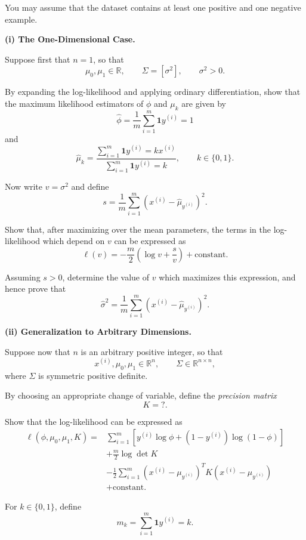 \documentclass[10pt]{article}
\newcommand{\ind}{\mathbf{1}}
\begin{document}
\begin{enumerate}
\begin{enumerate}[label=(\alph*)]
You may assume that the dataset contains at least
one positive and one negative example.

\medskip
\noindent\textbf{(i) The One-Dimensional Case.}

Suppose first that $n=1$, so that
\[
\mu_0,\mu_1\in\mathbb{R},
\qquad
\Sigma=[\sigma^2],
\qquad
\sigma^2>0.
\]

By expanding the log-likelihood and applying ordinary
differentiation, show that the maximum likelihood
estimators of $\phi$ and $\mu_k$ are given by
\[
\boxed{
\hat{\phi}
=
\frac{1}{m}
\sum_{i=1}^{m}
\ind{y^{(i)}=1}
}
\]
and
\[
\boxed{
\hat{\mu}_k
=
\frac{
\sum_{i=1}^{m}
\ind{y^{(i)}=k}x^{(i)}
}{
\sum_{i=1}^{m}
\ind{y^{(i)}=k}
},
\qquad k\in\{0,1\}.
}
\]

Now write $v=\sigma^2$ and define
\[
s
=
\frac{1}{m}
\sum_{i=1}^{m}
\left(
x^{(i)}-\hat{\mu}_{y^{(i)}}
\right)^2.
\]

Show that, after maximizing over the mean parameters,
the terms in the log-likelihood which depend on $v$
can be expressed as
\[
\ell(v)
=
-\frac{m}{2}
\left(
\log v+\frac{s}{v}
\right)
+\text{constant}.
\]

Assuming $s>0$, determine the value of $v$
which maximizes this expression, and hence prove that
\[
\boxed{
\hat{\sigma}^2
=
\frac{1}{m}
\sum_{i=1}^{m}
\left(
x^{(i)}-\hat{\mu}_{y^{(i)}}
\right)^2.
}
\]

\medskip
\noindent\textbf{(ii) Generalization to Arbitrary Dimensions.}

Suppose now that $n$ is an arbitrary positive integer,
so that
\[
x^{(i)},\mu_0,\mu_1\in\mathbb{R}^{n},
\qquad
\Sigma\in\mathbb{R}^{n\times n},
\]
where $\Sigma$ is symmetric positive definite.

By choosing an appropriate change of variable, define the \emph{precision matrix}
\[
\boxed{
K = ? .
}
\]

Show that the log-likelihood can be expressed as
\[
\begin{aligned}
\ell(\phi,\mu_0,\mu_1,K)
={}&
\sum_{i=1}^{m}
\left[
y^{(i)}\log\phi
+
(1-y^{(i)})\log(1-\phi)
\right]
\\[4pt]
&+
\frac{m}{2}\log\det K
\\[4pt]
&-
\frac{1}{2}
\sum_{i=1}^{m}
(x^{(i)}-\mu_{y^{(i)}})^T
K
(x^{(i)}-\mu_{y^{(i)}})
\\[4pt]
&+\text{constant}.
\end{aligned}
\]

For $k\in\{0,1\}$, define
\[
m_k
=
\sum_{i=1}^{m}
\ind{y^{(i)}=k}.
\]


\end{enumerate}
\end{enumerate}
\end{document}
